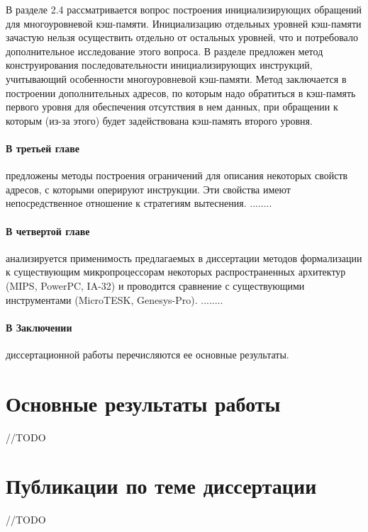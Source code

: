 \documentclass[14pt,autoref,href
,facsimile
]{disser}
\begin{document}
В разделе 2.4 рассматривается вопрос построения инициализирующих обращений для многоуровневой кэш-памяти. Инициализацию отдельных уровней кэш-памяти зачастую нельзя осуществить отдельно от остальных уровней, что и потребовало дополнительное исследование этого вопроса. В разделе предложен метод конструирования последовательности инициализирующих инструкций, учитывающий особенности многоуровневой кэш-памяти. Метод заключается в построении дополнительных адресов, по которым надо обратиться в кэш-память первого уровня для обеспечения отсутствия в нем данных, при обращении к которым (из-за этого) будет задействована кэш-память второго уровня.

\paragraph{В третьей главе} предложены методы построения ограничений для описания некоторых свойств адресов, с которыми оперируют инструкции. Эти свойства имеют непосредственное отношение к стратегиям вытеснения. ........

\paragraph{В четвертой главе} анализируется применимость предлагаемых в диссертации методов формализации к существующим микропроцессорам некоторых распространенных архитектур (MIPS, PowerPC, IA-32) и проводится сравнение с существующими инструментами (MicroTESK, Genesys-Pro). ........





\paragraph{В Заключении} диссертационной работы перечисляются ее основные результаты.


\section*{Основные результаты работы}
//TODO


\section*{Публикации по теме диссертации}
//TODO



%
%
\end{document}
